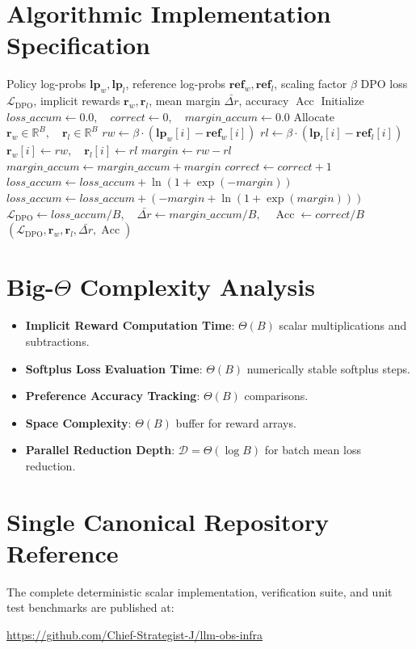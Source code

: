 \documentclass[11pt,a4paper]{article}
\theoremstyle{definition}
\begin{document}
\section{Algorithmic Implementation Specification}

\begin{algorithm}[H]
\caption{DPO Loss Evaluation and Implicit Reward Tracking}
\begin{algorithmic}[1]
\Require Policy log-probs $\mathbf{lp}_w, \mathbf{lp}_l$, reference log-probs $\mathbf{ref}_w, \mathbf{ref}_l$, scaling factor $\beta$
\Ensure DPO loss $\mathcal{L}_{\text{DPO}}$, implicit rewards $\mathbf{r}_w, \mathbf{r}_l$, mean margin $\bar{\Delta r}$, accuracy $\operatorname{Acc}$
\State Initialize $loss\_accum \gets 0.0, \quad correct \gets 0, \quad margin\_accum \gets 0.0$
\State Allocate $\mathbf{r}_w \in \mathbb{R}^B, \quad \mathbf{r}_l \in \mathbb{R}^B$
    \State $rw \gets \beta \cdot (\mathbf{lp}_w[i] - \mathbf{ref}_w[i])$
    \State $rl \gets \beta \cdot (\mathbf{lp}_l[i] - \mathbf{ref}_l[i])$
    \State $\mathbf{r}_w[i] \gets rw, \quad \mathbf{r}_l[i] \gets rl$
    \State $margin \gets rw - rl$
    \State $margin\_accum \gets margin\_accum + margin$
        \State $correct \gets correct + 1$
    \EndIf
        \State $loss\_accum \gets loss\_accum + \ln(1 + \exp(-margin))$
    \Else
        \State $loss\_accum \gets loss\_accum + (-margin + \ln(1 + \exp(margin)))$
    \EndIf
\EndFor
\State $\mathcal{L}_{\text{DPO}} \gets loss\_accum / B, \quad \bar{\Delta r} \gets margin\_accum / B, \quad \operatorname{Acc} \gets correct / B$
\State \Return $(\mathcal{L}_{\text{DPO}}, \mathbf{r}_w, \mathbf{r}_l, \bar{\Delta r}, \operatorname{Acc})$
\end{algorithmic}
\end{algorithm}

\section{Big-$\Theta$ Complexity Analysis}

\begin{itemize}
    \item \textbf{Implicit Reward Computation Time}: $\Theta(B)$ scalar multiplications and subtractions.
    \item \textbf{Softplus Loss Evaluation Time}: $\Theta(B)$ numerically stable softplus steps.
    \item \textbf{Preference Accuracy Tracking}: $\Theta(B)$ comparisons.
    \item \textbf{Space Complexity}: $\Theta(B)$ buffer for reward arrays.
    \item \textbf{Parallel Reduction Depth}: $\mathcal{D} = \Theta(\log B)$ for batch mean loss reduction.
\end{itemize}

\section{Single Canonical Repository Reference}

The complete deterministic scalar implementation, verification suite, and unit test benchmarks are published at:
\begin{center}
\url{https://github.com/Chief-Strategist-J/llm-obs-infra}
\end{center}
\end{document}
